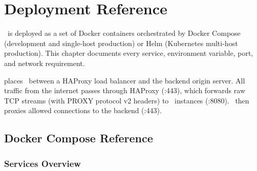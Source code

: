 
\chapter{Deployment Reference}
\label{ch:deployment}

\begin{chapterquote}
\ja\ is deployed as a set of Docker containers orchestrated by Docker Compose
(development and single-host production) or Helm (Kubernetes multi-host production).
This chapter documents every service, environment variable, port, and network
requirement.
\end{chapterquote}

 places \ja\ between a HAProxy
load balancer and the backend origin server. All traffic from the internet passes
through HAProxy (:443), which forwards raw TCP streams (with PROXY protocol v2
headers) to \ja\ instances (:8080). \ja\ then proxies allowed connections to the
backend (:443).

\section{Docker Compose Reference}

\subsection{Services Overview}

